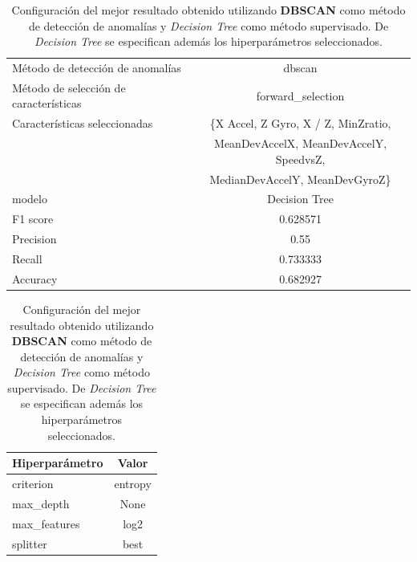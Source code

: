 \begin{appendices}
		\begin{table}[htb]
			\centering
			\caption{Configuración del mejor resultado obtenido utilizando \textbf{DBSCAN} como método de detección de anomalías y \emph{Decision Tree}
			como método supervisado. De \emph{Decision Tree} se especifican además los hiperparámetros seleccionados.}
			\label{table:23}
			\begin{tabular}{lc}
				\toprule
					  Método de detección de anomalías &                                             dbscan \\
				Método de selección de características &                                  forward\_selection \\
						 Características seleccionadas &		\{X Accel, Z Gyro, X / Z, MinZratio, \\
						 							   &			MeanDevAccelX, MeanDevAccelY, SpeedvsZ, \\
													   &                                   MedianDevAccelY, MeanDevGyroZ\} \\
												modelo &                                      Decision Tree \\
											  F1 score &                                           0.628571 \\
											 Precision &                                               0.55 \\
												Recall &                                           0.733333 \\
											  Accuracy &                                           0.682927 \\
				\bottomrule
			\end{tabular}
			\newline
			\newline

			\begin{tabular}{lc}
				\toprule
				Hiperparámetro &   Valor \\
				\midrule
					 criterion & entropy \\
					 max\_depth &    None \\
				  max\_features &    log2 \\
					  splitter &    best \\
				\bottomrule
			\end{tabular}
			
		\end{table}


\end{appendices}
